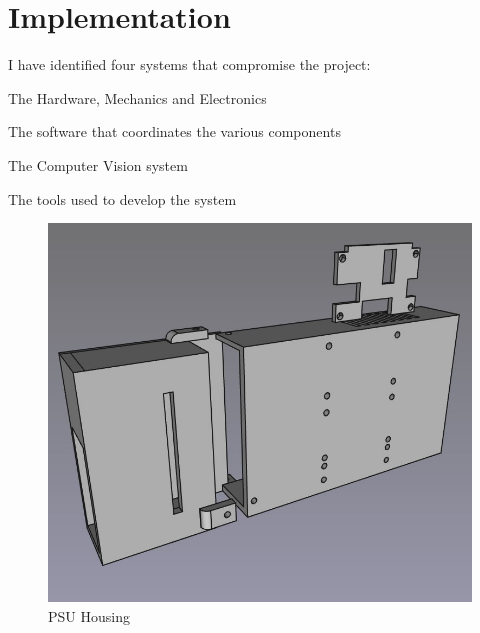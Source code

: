 \section{Implementation}
I have identified four systems that compromise the project:
\begin{mylist}
  \item The Hardware, Mechanics and Electronics
  \item The software that coordinates the various components
  \item The Computer Vision system
  \item The tools used to develop the system
\end{mylist}


\begin{figure}
  \begin{minipage}[t]{0.32\textwidth}
    \centering
    \includegraphics[width=\textwidth]{imgs/freecad/psu_mount.jpg}
    \caption{PSU Housing}
  \end{minipage}
  \hfill
  \begin{minipage}[t]{0.32\textwidth}
    \centering

\end{minipage}
\end{figure}
